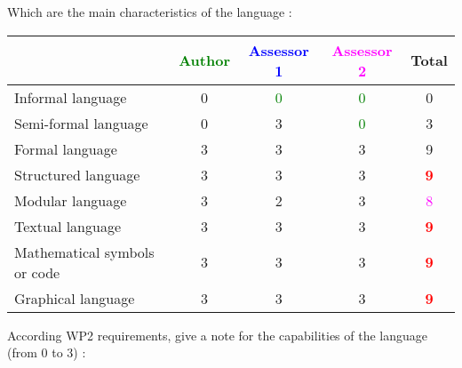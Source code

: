 Which are the main characteristics of the language :

\begin{tabular}{|l | c | c | c | c|}
\hline
& \textcolor{green}{Author} & \textcolor{blue}{Assessor 1} & \textcolor{magenta}{Assessor 2} & Total \\
\hline 
Informal language &  0  & \textcolor{green}{0} & \textcolor{green}{0}   &  0 \\
\hline 
Semi-formal language &  0  & 3     & \textcolor{green}{0}   &  3 \\
\hline
Formal language &  3  & 3     &3 &  9 \\
\hline
Structured language &  3  & 3     &3 & \textcolor{red}{\textbf{9}} \\
\hline
Modular language &  3  & 2     &3 & \textcolor{magenta}{8} \\
\hline
Textual language & 3     & 3     &3 & \textcolor{red}{\textbf{9}} \\
\hline
Mathematical symbols or code & 3     & 3     &3 & \textcolor{red}{\textbf{9}} \\
\hline
Graphical language & 3     & 3     &3 & \textcolor{red}{\textbf{9}} \\
\hline
\end{tabular}

According WP2 requirements, give a note for the capabilities of the language (from 0 to 3) :

